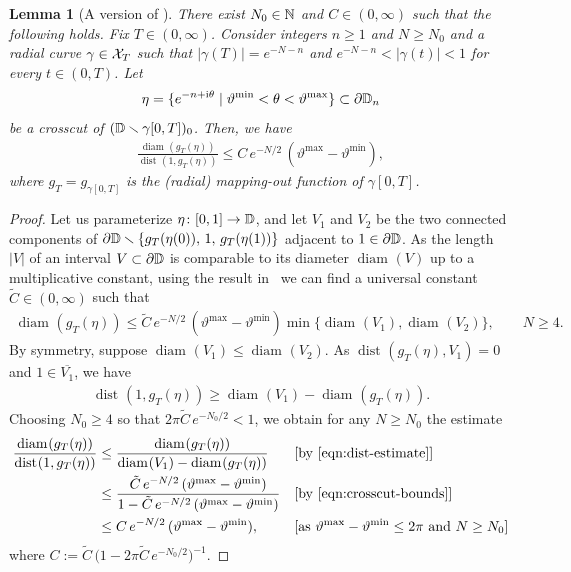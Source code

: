 \documentclass[a4paper, 11pt]{article}
\newtheorem{lem}[thm]{Lemma}
\theoremstyle{definition}
\numberwithin{equation}{section}
\numberwithin{figure}{section}
\newcommand{\Dpaths}[1][]{\cX_{#1}}
\renewcommand{\dist}[1][]{\operatorname{dist}_{#1}}
\renewcommand{\diam}[1][]{\operatorname{diam}_{#1}}
\newcommand{\component}[2]{(#1)_{#2}}
\newcommand{\cond}{\;|\;}
\begin{document}
\begin{lem}[A version of {\cite[Lemma 2.6]{Lawler:Continuity_of_radial_and_two-sided_radial_SLE_at_the_terminal_point}}]\label{thm:crosscut-estimate}
There exist $N_0 \in \mathbb{N}$ and $C \in (0,\infty)$ such that the following holds. 
Fix $T \in (0,\infty)$. 
Consider integers $n \ge 1$ and $N \ge N_0$ and a radial curve $\gamma \in \Dpaths[T]$ such that $|\gamma(T)| = e^{-N-n}$ and $e^{-N-n} < |\gamma(t)| < 1$ for every $t \in (0, T)$. Let
\begin{align*} 
\eta = \{e^{-n+\ii\theta} \cond \vartheta^{\min} < \theta < \vartheta^{\max}\} \subset \partial\bD_n 
\end{align*}
be a crosscut of $\component{\bD\smallsetminus \gamma[0,T]}{0}$. Then, we have
\begin{align*}
\frac{\diam(g_T(\eta))}{\dist(1, g_T(\eta))} \le C \, e^{-N/2} \,(\vartheta^{\max}-\vartheta^{\min}),
\end{align*}
where $g_T = g_{\gamma[0,T]}$ is the \textnormal{(}radial\textnormal{)} mapping-out function of $\gamma[0,T]$.
\end{lem}

\begin{proof}
Let us parameterize $\eta \colon [0, 1] \to \mathbb{D}$, and let $V_1$ and $V_2$ be 
the two connected components of $\partial \mathbb{D}\smallsetminus\{g_T(\eta(0)), \, 1, \, g_T(\eta(1))\}$ adjacent to $1 \in \partial\mathbb{D}$. 
As the length $|V|$ of an interval $V \subset \partial \mathbb{D}$ is comparable to its diameter $\diam(V)$ up to a multiplicative constant, 
using the result in~\cite[Lemma~2.6]{Lawler:Continuity_of_radial_and_two-sided_radial_SLE_at_the_terminal_point} 
we can find a universal constant $\tilde{C} \in (0,\infty)$ such that 
\begin{align}\label{eqn:crosscut-bounds}
\diam(g_T(\eta)) \le \tilde{C} \, e^{-N/2} \,(\vartheta^{\max} - \vartheta^{\min}) \min\big\{\diam(V_1), \diam(V_2)\big\}
, \qquad N \ge 4 .
\end{align}
By symmetry, suppose $\diam(V_1) \le \diam(V_2)$. 
As $\dist(g_T(\eta), V_1) = 0$ and $1 \in \overline{V_1}$, we have
\begin{align}\label{eqn:dist-estimate}
\dist(1, g_T(\eta)) \ge \diam(V_1) - \diam(g_T(\eta)).
\end{align} 
Choosing $N_0 \ge 4$ so that $2\pi \tilde{C} \,e^{-N_0/2} < 1$, we obtain for any $N \ge N_0$ the estimate
\begin{align*}
\frac{\diam(g_T(\eta))}{\dist(1,g_T(\eta))} \le\;& \frac{\diam(g_T(\eta))}{\diam(V_1) - \diam(g_T(\eta))} 
&& \textnormal{[by~\eqref{eqn:dist-estimate}]} \\
\le\;& \frac{\tilde{C} \, e^{-N/2}\, (\vartheta^{\max} - \vartheta^{\min})}{1 - \tilde{C} \, e^{-N/2}\, (\vartheta^{\max}-\vartheta^{\min})} 
&& \textnormal{[by~\eqref{eqn:crosscut-bounds}]} \\
\le\;& C \, e^{-N/2} \, (\vartheta^{\max}-\vartheta^{\min}) ,
&& \textnormal{[as $\vartheta^{\max}-\vartheta^{\min} \le 2\pi$ and $N \ge N_0$]}
\end{align*}
where $C := \tilde{C} \, \big( 1-2\pi \tilde{C} \, e^{-N_0/2}\big)^{-1}$.
\end{proof}
\end{document}
